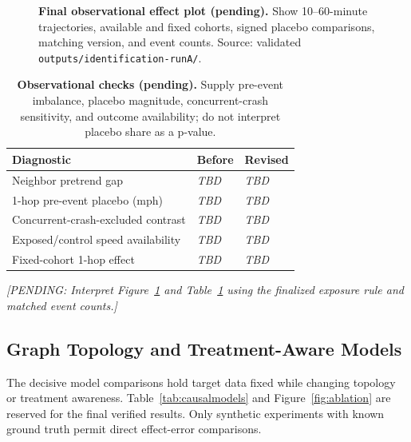 \documentclass[sigconf,nonacm]{acmart}
\newcommand{\pending}[1]{\textcolor{pendinggray}{\emph{[PENDING: #1]}}}
\newcommand{\tbd}{\textcolor{pendinggray}{\textit{TBD}}}
\newcommand{\widefigslot}[2]{%
  \fbox{\begin{minipage}[c][#1][c]{0.92\textwidth}
  \centering\small\textcolor{pendinggray}{\textbf{[FIGURE PENDING]}}\\[5pt]
  \textcolor{pendinggray}{#2}
  \end{minipage}}}
\begin{document}
\begin{figure}[t]
\centering
\widefigslot{1.12in}{Panel A: 0/1/2-hop contrasts with event-level 95\% intervals\\[3pt]
Panel B: fixed-cohort estimates, pre-event placebo and neighbor-specific controls}
\caption{\textbf{Final observational effect plot (pending).} Show 10--60-minute
trajectories, available and fixed cohorts, signed placebo comparisons,
matching version, and event counts. Source: validated
\texttt{outputs/identification-runA/}.}
\label{fig:eventcurves}
\end{figure}

\begin{table}[t]
\centering
\caption{\textbf{Observational checks (pending).} Supply
pre-event imbalance, placebo magnitude, concurrent-crash sensitivity,
and outcome availability; do not interpret placebo share as a p-value.}
\label{tab:diagnostics}
\footnotesize
\begin{tabular}{p{}p{}p{}}
\toprule
Diagnostic & Before & Revised \\
\midrule
Neighbor pretrend gap & \tbd & \tbd \\
1-hop pre-event placebo (mph) & \tbd & \tbd \\
Concurrent-crash-excluded contrast & \tbd & \tbd \\
Exposed/control speed availability & \tbd & \tbd \\
Fixed-cohort 1-hop effect & \tbd & \tbd \\
\bottomrule
\end{tabular}
\end{table}

\pending{Interpret Figure~\ref{fig:eventcurves} and Table~\ref{tab:diagnostics}
using the finalized exposure rule and matched event counts.}

\subsection{Graph Topology and Treatment-Aware Models}
The decisive model comparisons hold target data fixed while changing
topology or treatment awareness. Table~\ref{tab:causalmodels} and
Figure~\ref{fig:ablation} are reserved for the final verified
results. Only synthetic experiments with known ground truth permit
direct effect-error comparisons.
\end{document}
